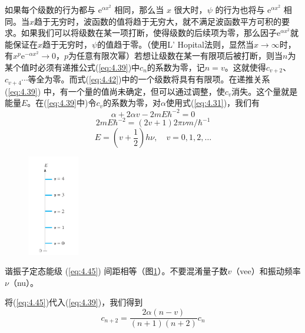     如果每个级数的行为都与 $\mathrm{e}^{\alpha x^2}$ 相同，那么当 $x$ 很大时，$\psi$ 的行为也将与 $\mathrm{e}^{\alpha x^2}$ 相同。当$x$趋于无穷时，波函数的值将趋于无穷大，就不满足波函数平方可积的要求。如果我们可以将级数在某一项打断，使得级数的后续项为零，那么因子$\mathrm{e}^{\alpha x^2}$就能保证在$x$趋于无穷时，$\psi$的值趋于零。（使用L' Hopital法则，显然当$x \to \infty$时，有$x^p\mathrm{e}^{-\alpha x^2} \to 0$，$p$为任意有限次幂）若想让级数在某一有限项后被打断，则当$n$为某个值时必须有递推公式(\ref{eq:4.39})中$c_n$的系数为零，记$n=v$。这就使得$c_{v+2}$、$c_{v+4}$$\cdots$等全为零。而式(\ref{eq:4.42})中的一个级数将具有有限项。在递推关系 (\ref{eq:4.39}) 中，有一个量的值尚未确定，但可以通过调整，使$c_v$消失。这个量就是能量$E$。在(\ref{eq:4.39}中)令$c_v$的系数为零，对$\alpha$使用式(\ref{eq:4.31})，我们有
    \begin{equation*}
        \alpha + 2\alpha v - 2mE\hbar^{-2} = 0
    \end{equation*}
    \begin{equation*}
        2mE\hbar^{-2} = \left(2v+1\right)2\pi\nu m/\hbar^{-1}
    \end{equation*}
    \begin{equation}
        \boxed{
            E = \left(v+\frac{1}{2}\right)h\nu, \quad v = 0, 1, 2, \ldots
        }
        \label{eq:4.45}
    \end{equation}
    \begin{figure}[ht]
        \centering
        \includegraphics[width=0.2\textwidth]{Figures/4.1.png}
        \caption{}
        \label{fig:4.1}
    \end{figure}
    谐振子定态能级 (\ref{eq:4.45}) 间距相等（图\ref{fig:4.1}）。不要混淆量子数$v$（vee）和振动频率$\nu$（nu）。

     将(\ref{eq:4.45})代入(\ref{eq:4.39})，我们得到
    \begin{equation}
        c_{n+2} = \frac{2\alpha \left(n-v\right)}{(n+1)(n+2)}c_n
        \label{eq:4.46}
    \end{equation}

